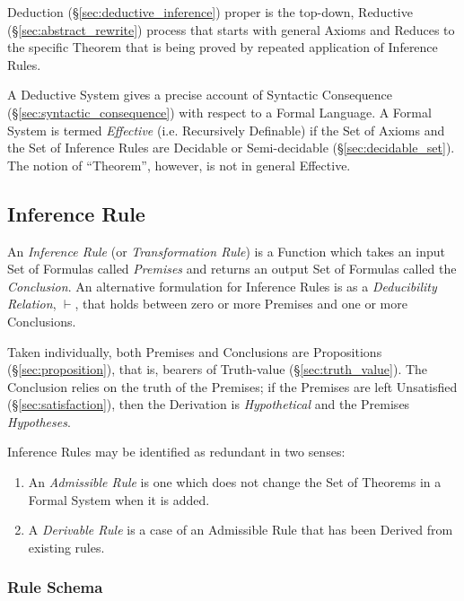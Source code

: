 Deduction (\S\ref{sec:deductive_inference}) proper is the top-down,
Reductive (\S\ref{sec:abstract_rewrite}) process that starts with
general Axioms and Reduces to the specific Theorem that is being
proved by repeated application of Inference Rules.

A Deductive System gives a precise account of Syntactic Consequence
(\S\ref{sec:syntactic_consequence}) with respect to a Formal Language.
A Formal System is termed \emph{Effective} (i.e. Recursively
Definable) if the Set of Axioms and the Set of Inference Rules are
Decidable or Semi-decidable (\S\ref{sec:decidable_set}). The notion of
``Theorem'', however, is not in general Effective.



\subsection{Inference Rule}\label{sec:inference_rule}

An \emph{Inference Rule} (or \emph{Transformation Rule}) is a Function which
takes an input Set of Formulas called \emph{Premises} and returns an output Set
of Formulas called the \emph{Conclusion}. An alternative formulation for
Inference Rules is as a \emph{Deducibility Relation}, $\vdash$, that holds
between zero or more Premises and one or more Conclusions.

Taken individually, both Premises and Conclusions are Propositions
(\S\ref{sec:proposition}), that is, bearers of Truth-value
(\S\ref{sec:truth_value}). The Conclusion relies on the truth of the Premises;
if the Premises are left Unsatisfied (\S\ref{sec:satisfaction}), then the
Derivation is \emph{Hypothetical} and the Premises \emph{Hypotheses}.

Inference Rules may be identified as redundant in two senses:
\begin{enumerate}
  \item An \emph{Admissible Rule} is one which does not change the Set
    of Theorems in a Formal System when it is added.
  \item A \emph{Derivable Rule} is a case of an Admissible Rule that
    has been Derived from existing rules.
\end{enumerate}



\subsubsection{Rule Schema}\label{sec:rule_schema}



